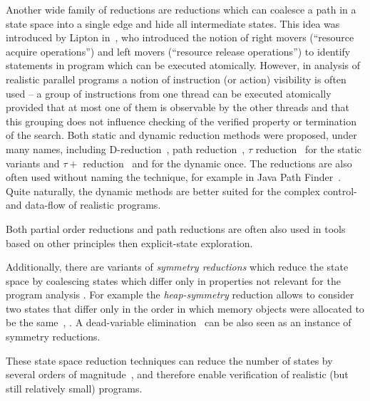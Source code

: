 Another wide family of reductions are reductions which can coalesce a path in a
state space into a single edge and hide all intermediate states.
This idea was introduced by Lipton in~, who introduced the
notion of right movers (``resource acquire operations'') and left movers
(``resource release operations'') to identify statements in program which can
be executed atomically.
However, in analysis of realistic parallel programs a notion of instruction (or
action) visibility is often used -- a group of instructions from one thread can
be executed atomically provided that at most one of them is observable by the
other threads and that this grouping does not influence checking of the
verified property or termination of the search.
Both static and dynamic reduction methods were proposed, under many names,
including D-reduction~, path reduction~, $\tau$ reduction~ for the static variants and $\tau+$ reduction~ and  for the dynamic once.
The reductions are also often used without naming the technique, for example in
Java Path Finder~.
Quite naturally, the dynamic methods are better suited for the complex control-
and data-flow of realistic programs.

Both partial order reductions and path reductions are often also used in tools
based on other principles then explicit-state exploration.

Additionally, there are variants of \emph{symmetry reductions} which reduce the
state space by coalescing states which differ only in properties not relevant
for the program analysis \cite{Clarke1998}.
For example the \emph{heap-symmetry} reduction allows to consider two states
that differ only in the order in which memory objects were allocated to be the
same~, .
A dead-variable elimination~ can be also seen as an instance of symmetry reductions.

These state space reduction techniques can reduce the number of states by
several orders of magnitude~, and therefore enable verification of
realistic (but still relatively small) programs.

